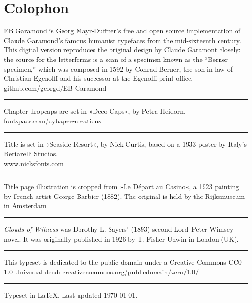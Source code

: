 \documentclass[
paper=5.5in:8.5in,
BCOR=7mm,
twoside,
DIV=calc,
11pt,
usegeometry,
chapterprefix,
headings=big]{scrbook} %
\begin{document}
\chapter*{Colophon}
\begin{center}
EB Garamond is Georg Mayr-Duffner's free and open source implementation of Claude Garamond’s famous humanist typefaces from the mid-sixteenth century. This digital version reproduces the original design by Claude Garamont closely: the source for the letterforms is a scan of a specimen known as the \enquote{Berner specimen,} which was composed in 1592 by Conrad Berner, the son-in-law of Christian Egenolff and his successor at the Egenolff print office.\\github.com/georgd/EB-Garamond
\vfill
\rule{0.5\textwidth}{.4pt}
\vfill
Chapter dropcaps are set in »Deco Caps«, by Petra Heidorn.\\fontspace.com/cybapee-creations
\vfill
\rule{0.5\textwidth}{.4pt}
\vfill
Title is set in »Seaside Resort«, by Nick Curtis, based on a 1933 poster by Italy’s Bertarelli Studios.\\www.nicksfonts.com
\vfill
\rule{0.5\textwidth}{.4pt}
\vfill
Title page illustration is cropped from »Le Départ au Casino«, a 1923 painting by French artist George Barbier (1882). The original is held by the Rijksmuseum in Amsterdam.
\vfill
\rule{0.5\textwidth}{.4pt}
\vfill
\textit{Clouds of Witness} was Dorothy L. Sayers' (1893) second Lord~Peter Wimsey novel. It was originally published in 1926 by T. Fisher Unwin in London (UK).
\vfill
\rule{0.5\textwidth}{.4pt}
\vfill
This typeset is dedicated to the public domain under a Creative Commons CC0 1.0 Universal deed: creativecommons.org/publicdomain/zero/1.0/
\vfill
\rule{0.5\textwidth}{.4pt}
\vfill
Typeset in \LaTeX{}. Last updated \today.
\end{center}
\thispagestyle{empty}
\end{document}
